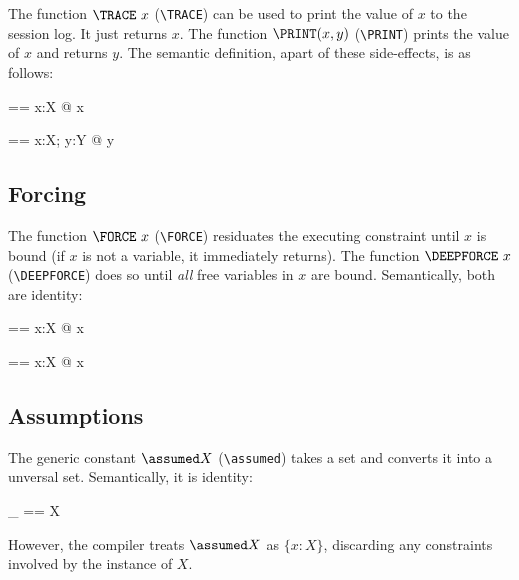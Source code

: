 \documentclass{article}
\begin{document}
The function $\TRACE~x$ (\verb:\TRACE:) can be used to print the value
of $x$ to the session log. It just returns $x$. The function
$\PRINT(x,y)$ (\verb:\PRINT:) prints the value of $x$ and returns $y$.
The semantic definition, apart of these side-effects, is as follows:

\begin{zedgroup}
\begin{axdef}[X]
  \TRACE == \lambda x:X @ x
\end{axdef}
\begin{axdef}[X,Y]
  \PRINT == \lambda x:X; y:Y @ y
\end{axdef}
\end{zedgroup}

\subsection{Forcing}

The function $\FORCE~x$ (\verb:\FORCE:) residuates the executing
constraint until $x$ is bound (if $x$ is not a variable, it immediately
returns). The function $\DEEPFORCE~x$ (\verb:\DEEPFORCE:) does so
until \emph{all} free variables in $x$ are bound. Semantically,
both are identity:

\begin{zedgroup}
\begin{axdef}[X]
  \FORCE == \lambda x:X @ x 
\end{axdef}
\begin{axdef}[X]
  \DEEPFORCE == \lambda x:X @ x
\end{axdef}
\end{zedgroup}

\subsection{Assumptions}

The generic constant $\assumed X$ (\verb:\assumed:) takes a set and
converts it into a unversal set. Semantically, it is identity: 

\begin{zedgroup}
\begin{zdirectives}
\end{zdirectives}
\begin{axdef}[X]
  \assumed \_ == X
\end{axdef}
\end{zedgroup}

However, the compiler treats $\assumed X$ as $\{x:X\}$, discarding
any constraints involved by the instance of $X$.
\end{document}
